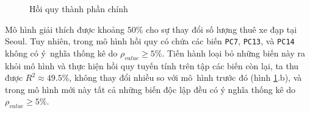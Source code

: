 \begin{figure}[H]
	\centering
	 \hfill
	\caption{Hồi quy thành phần chính}
	\label{A2_modPCA}
\end{figure}

Mô hình giải thích được khoảng $50\%$ cho sự thay đổi số lượng thuê xe đạp tại Seoul. Tuy nhiên, trong mô hình hồi quy có chứa các biến \texttt{PC7}, \texttt{PC13}, và \texttt{PC14} không có ý~nghĩa thống kê do $\rho_{value} \ge 5\%$. Tiến hành loại bỏ những biến này ra khỏi mô hình và thực hiện hồi quy tuyến tính trên tập các biến còn lại, ta thu được $R^{2} \approx 49.5\% $, không thay đổi nhiều so với mô~hình trước đó (hình \ref{A2_modPCA}.b), và trong mô hình mới này tất cả những biến độc lập đều có ý nghĩa thống kê do $\rho_{value} \ge 5\%$.

